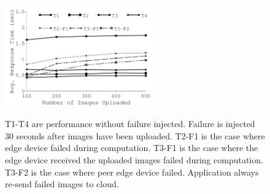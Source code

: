 {
\begin{figure}[th]
\begin{center}
	\centerline{\includegraphics[width=2.5in]{Figures/g_plot_app.pdf}}
	{
		T1-T4 are performance without failure injected. Failure is injected 30 seconds
		after images have been uploaded. T2-F1 is the case where
		edge device failed during computation. T3-F1 is the case where the edge
		device received the uploaded images failed during computation. T3-F2 is
		the case where peer edge device failed. Application always re-send failed
		images to cloud.
	}
\end{center}
\end{figure}
}

